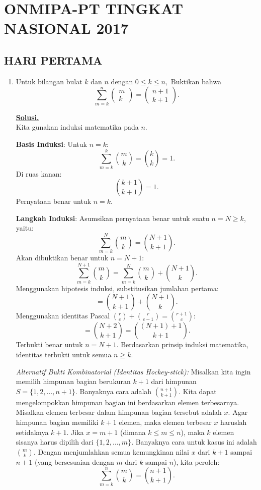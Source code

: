 \documentclass[12pt,twoside]{article}
\newenvironment{solution}
{
	\par\noindent\textbf{\underline{Solusi.}}\\
}
{
	\par
}
\begin{document}
\section{ONMIPA-PT TINGKAT NASIONAL 2017}
\subsection{HARI PERTAMA}
\begin{enumerate}
  \item Untuk bilangan bulat $k$ dan $n$ dengan $0 \leq k \leq n,$ Buktikan bahwa
        \begin{equation*}
          \displaystyle\sum_{m=k}^{n} \begin{pmatrix}
            m \\k
          \end{pmatrix} = \begin{pmatrix}
            n+1 \\k+1
          \end{pmatrix}.
        \end{equation*}
        \begin{solution}
          Kita gunakan induksi matematika pada $n$.

          \textbf{Basis Induksi}:
          Untuk $n=k$:
          \[ \sum_{m=k}^{k} \binom{m}{k} = \binom{k}{k} = 1. \]
          Di ruas kanan:
          \[ \binom{k+1}{k+1} = 1. \]
          Pernyataan benar untuk $n=k$.

          \textbf{Langkah Induksi}:
          Asumsikan pernyataan benar untuk suatu $n=N \ge k$, yaitu:
          \[ \sum_{m=k}^{N} \binom{m}{k} = \binom{N+1}{k+1}. \]
          Akan dibuktikan benar untuk $n=N+1$:
          \[ \sum_{m=k}^{N+1} \binom{m}{k} = \sum_{m=k}^{N} \binom{m}{k} + \binom{N+1}{k}. \]
          Menggunakan hipotesis induksi, substitusikan jumlahan pertama:
          \[ = \binom{N+1}{k+1} + \binom{N+1}{k}. \]
          Menggunakan identitas Pascal $\binom{r}{c} + \binom{r}{c-1} = \binom{r+1}{c}$:
          \[ = \binom{N+2}{k+1} = \binom{(N+1)+1}{k+1}. \]
          Terbukti benar untuk $n=N+1$.
          Berdasarkan prinsip induksi matematika, identitas terbukti untuk semua $n \ge k$.

          \textit{Alternatif Bukti Kombinatorial (Identitas Hockey-stick):}
          Misalkan kita ingin memilih himpunan bagian berukuran $k+1$ dari himpunan $S = \{1, 2, \dots, n+1\}$. Banyaknya cara adalah $\binom{n+1}{k+1}$.
          Kita dapat mengelompokkan himpunan bagian ini berdasarkan elemen terbesarnya.
          Misalkan elemen terbesar dalam himpunan bagian tersebut adalah $x$.
          Agar himpunan bagian memiliki $k+1$ elemen, maka elemen terbesar $x$ haruslah setidaknya $k+1$.
          Jika $x = m+1$ (dimana $k \le m \le n$), maka $k$ elemen sisanya harus dipilih dari $\{1, 2, \dots, m\}$. Banyaknya cara untuk kasus ini adalah $\binom{m}{k}$.
          Dengan menjumlahkan semua kemungkinan nilai $x$ dari $k+1$ sampai $n+1$ (yang bersesuaian dengan $m$ dari $k$ sampai $n$), kita peroleh:
          \[ \sum_{m=k}^{n} \binom{m}{k} = \binom{n+1}{k+1}. \]
        \end{solution}


\end{enumerate}
\end{document}
